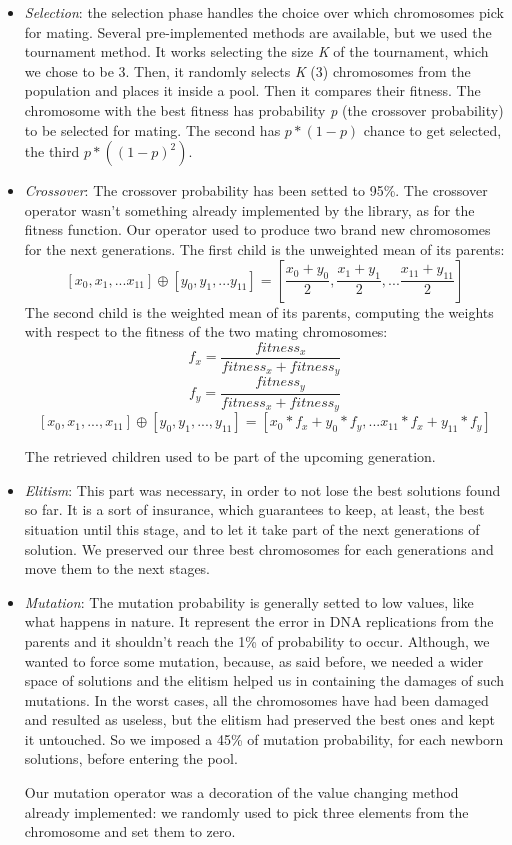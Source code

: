 \begin{itemize}
	\item[\PencilRight]\textit{Selection}: the selection phase handles the choice over which chromosomes pick for mating. Several pre-implemented methods are available, but we used the tournament method. It works selecting the size \textit{K} of the tournament, which we chose to be 3. Then, it randomly selects \textit{K} (3) chromosomes from the population and places it inside a pool. Then it compares their fitness. The chromosome with the best fitness has probability \textit{p} (the crossover probability) to be selected for mating. The second has $ p*(1-p) $ chance to get selected, the third $ p*((1-p)^{2}) $.
	\item[\PencilRight]\textit{Crossover}: The crossover probability has been setted to 95\%.
	The crossover operator wasn't something already implemented by the library, as for the fitness function. Our operator used to produce two brand new chromosomes for the next generations.
	The first child is the unweighted mean of its parents:
	\[ [x_{0}, x_{1}, ... x_{11}] \oplus [y_{0}, y_{1}, ... y_{11}] = [\frac{x_{0}+y_{0}}{2}, \frac{x_{1}+y_{1}}{2}, ... \frac{x_{11}+y_{11}}{2}]\]
	The second child is the weighted mean of its parents, computing the weights with respect to the fitness of the two mating chromosomes:
	\[ f_{x} = \frac{fitness_{x}}{fitness_{x}+fitness_{y}} \]
	\[ f_{y} = \frac{fitness_{y}}{fitness_{x}+fitness_{y}} \]
	\[ [x_{0}, x_{1}, ..., x_{11}] \oplus [y_{0}, y_{1}, ..., y_{11}] = [x_{0}*f_{x}+y_{0}*f_{y}, ... x_{11}*f_{x}+y_{11}*f_{y} ]\]
	
	The retrieved children used to be part of the upcoming generation.
	\item[\PencilRight]\textit{Elitism}: This part was necessary, in order to not lose the best solutions found so far. It is a sort of insurance, which guarantees to keep, at least, the best situation until this stage, and to let it take part of the next generations of solution. We preserved our three best chromosomes for each generations and move them to the next stages.
	\item[\PencilRight]\textit{Mutation}: The mutation probability is generally setted to low values, like what happens in nature. It represent the error in DNA replications from the parents and it shouldn't reach the 1\% of probability to occur.
	Although, we wanted to force some mutation, because, as said before, we needed a wider space of solutions and the elitism helped us in containing the damages of such mutations. In the worst cases, all the chromosomes have had been damaged and resulted as useless, but the elitism had preserved the best ones and kept it untouched. So we imposed a 45\% of mutation probability, for each newborn solutions, before entering the pool.
	
	Our mutation operator was a decoration of the value changing method already implemented: we randomly used to pick three elements from the chromosome and set them to zero.
\end{itemize}

